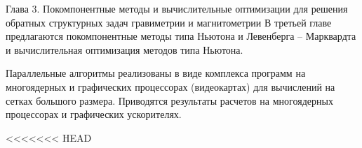 \documentclass[10pt,pdf, mathserif, hyperref={unicode}]{beamer}
\begin{document}
\begin{frame}{Глава 3. Покомпонентные методы и вычислительные оптимизации для решения обратных структурных задач гравиметрии и магнитометрии}
	В третьей главе предлагаются покомпонентные методы типа Ньютона и Левенберга -- Марквардта и вычислительная оптимизация методов типа Ньютона. 
	
	Параллельные алгоритмы реализованы в виде комплекса программ на многоядерных и графических процессорах (видеокартах) для вычислений на сетках большого размера. Приводятся результаты расчетов на многоядерных процессорах и графических ускорителях. 
	
\end{frame}
<<<<<<< HEAD
\end{document}
